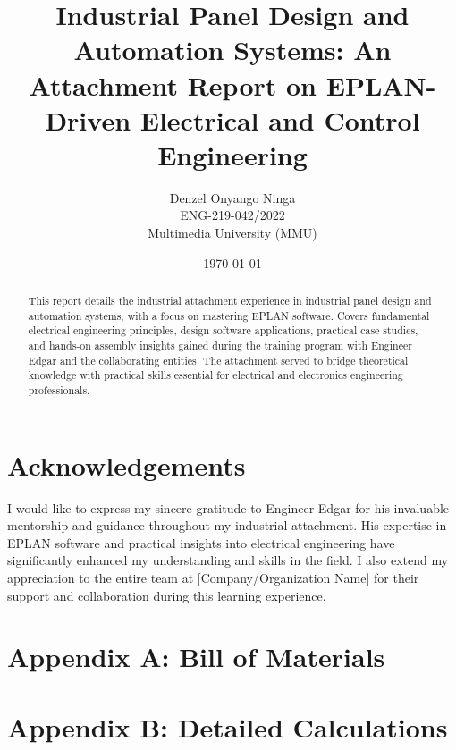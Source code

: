 \documentclass{report}
\title{Industrial Panel Design and Automation Systems: An Attachment Report on EPLAN-Driven Electrical and Control Engineering}
\author{Denzel Onyango Ninga \\ ENG-219-042/2022 \\ Multimedia University (MMU)}
\date{\today}
\begin{document}
\maketitle %


\begin{abstract}
    This report details the industrial attachment experience in industrial panel design and automation systems, with a focus on mastering EPLAN software. Covers fundamental electrical engineering principles, design software applications, practical case studies, and hands-on assembly insights gained during the training program with Engineer Edgar and the collaborating entities. The attachment served to bridge theoretical knowledge with practical skills essential for electrical and electronics engineering professionals.
\end{abstract}

\clearpage 
{} %
\setcounter{page}{1} %
\chapter*{Acknowledgements} %
I would like to express my sincere gratitude to Engineer Edgar for his invaluable mentorship and guidance throughout my industrial attachment. His expertise in EPLAN software and practical insights into electrical engineering have significantly enhanced my understanding and skills in the field. I also extend my appreciation to the entire team at [Company/Organization Name] for their support and collaboration during this learning experience.
\tableofcontents %
\clearpage %
\listoffigures %
\clearpage %
\listoftables %











\clearpage
 

\appendix

 \chapter{Appendix A: Bill of Materials}
 
 \chapter{Appendix B: Detailed Calculations}
 
\end{document}
